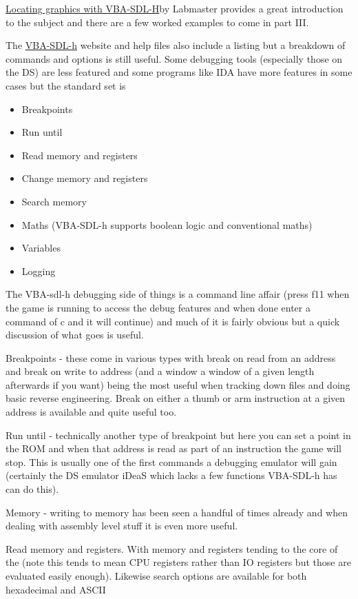 \documentclass[
]{book}
\providecommand{\tightlist}{%
  \setlength{\itemsep}{0pt}\setlength{\parskip}{0pt}}
\begin{document}
\href{http://www.romhacking.net/documents/361/}{Locating graphics with VBA-SDL-H}by Labmaster provides a great introduction to the subject and there are a few worked examples to come in part III.

The \href{http://labmaster.bios.net.nz/vba-sdl-h/\#commands}{VBA-SDL-h} website and help files also include a listing but a breakdown of commands and options is still useful. Some debugging tools (especially those on the DS) are less featured and some programs like IDA have more features in some cases but the standard set is

\begin{itemize}
\tightlist
\item
  Breakpoints
\item
  Run until
\item
  Read memory and registers
\item
  Change memory and registers
\item
  Search memory
\item
  Maths (VBA-SDL-h supports boolean logic and conventional maths)
\item
  Variables
\item
  Logging
\end{itemize}

The VBA-sdl-h debugging side of things is a command line affair (press f11 when the game is running to access the debug features and when done enter a command of c and it will continue) and much of it is fairly obvious but a quick discussion of what goes is useful.

Breakpoints - these come in various types with break on read from an address and break on write to address (and a window a window of a given length afterwards if you want) being the most useful when tracking down files and doing basic reverse engineering. Break on either a thumb or arm instruction at a given address is available and quite useful too.

Run until - technically another type of breakpoint but here you can set a point in the ROM and when that address is read as part of an instruction the game will stop. This is usually one of the first commands a debugging emulator will gain (certainly the DS emulator iDeaS which lacks a few functions VBA-SDL-h has can do this).

Memory - writing to memory has been seen a handful of times already and when dealing with assembly level stuff it is even more useful.

Read memory and registers. With memory and registers tending to the core of the (note this tends to mean CPU registers rather than IO registers but those are evaluated easily enough). Likewise search options are available for both hexadecimal and ASCII
\end{document}
